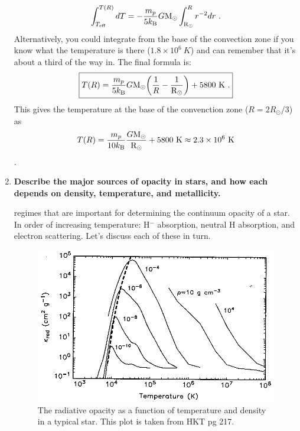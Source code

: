 \begin{enumerate}
	\begin{equation}
	\int^{T(R)}_{T_{\rm eff}} dT = -\frac{m_p}{5 k_{\rm B}} G {\rm M}_\odot \int^R_{\rm R_\odot} r^{-2}dr \,\, .
	\end{equation}
	Alternatively, you could integrate from the base of the convection zone if you know what the temperature is there ($1.8 \times 10^6~K$) and can remember that it's about a third of the way in. The final formula is:
	\begin{equation}\boxed{
	T(R) = \frac{m_p}{5 k_{\rm B}} G {\rm M}_\odot \biggl( \frac{1}{R} - \frac{1}{{\rm R}_\odot}\biggr) + 5800~{\rm K}\,\, .
	}\end{equation}
    This gives the temperature at the base of the convenction zone ($R=2R_\odot/3$) as
    \begin{dmath*}
	    T(R) = \frac{m_p}{10 k_{\rm B}} \frac{G {\rm M}_\odot}{{\rm R}_\odot} + 5800~{\rm K} \nolinebreak
             \approx 2.3\times10^6~{\rm K}
    \end{dmath*}.
	
\item \textbf{Describe the major sources of opacity in stars, and how each depends on density,
      temperature, and metallicity.}
      
       regimes that are important for determining the
      continuum opacity of a star.  In order of increasing temperature:
      H$^-$ absorption, neutral H absorption, and electron scattering.
      Let's discuss each of these in turn.

      \begin{figure}[ht]
      \centering
      \includegraphics{stars_opacities}
      \caption{The radiative opacity as a function of temperature and density in a typical star.
               This plot is taken from HKT pg 217.}
      \label{fig:opacities}
      \end{figure}


\end{enumerate}
